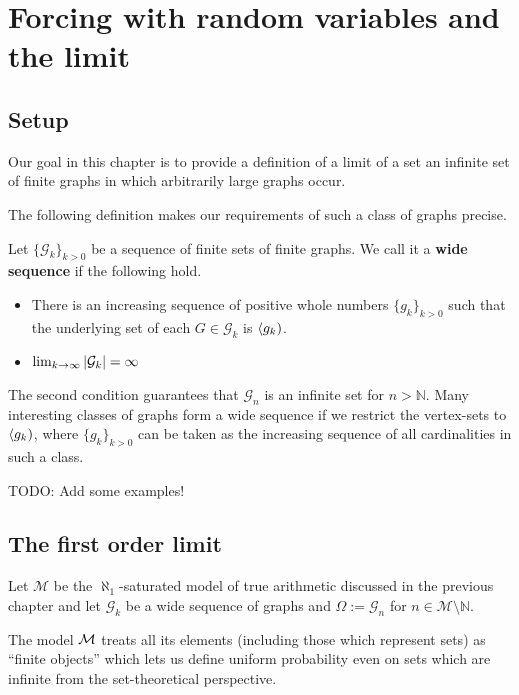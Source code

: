 \chapter{Forcing with random variables and the limit}
\section{Setup}

Our goal in this chapter is to provide a definition of a limit of a set an infinite set of finite graphs in which arbitrarily large graphs occur.

The following definition makes our requirements of such a class of graphs precise.

\begin{defi}
Let $\{\mathcal{G}_k\}_{k>0}$ be a sequence of finite sets of finite graphs. We call it a \textbf{wide sequence} if the following hold.

\begin{itemize}
\item There is an increasing sequence of positive whole numbers $\{g_k\}_{k>0}$ such that the underlying set of each $G\in\mathcal{G}_k$ is $\langle g_k)$.
\item $\lim_{k\to\infty} \left|{\mathcal{G}_k}\right|=\infty$
\end{itemize}
\end{defi}

The second condition guarantees that $\mathcal{G}_n$ is an infinite set for $n>\mathbb{N}$. Many interesting classes of graphs form a wide sequence if we restrict the vertex-sets to $\langle g_k)$, where $\{g_k\}_{k>0}$ can be taken as the increasing sequence of all cardinalities in such a class.

\begin{exam}
TODO: Add some examples!
\end{exam}

\section{The first order limit}

Let $\mathcal{M}$ be the $\aleph_1$-saturated model of true arithmetic discussed in the previous chapter and let $\mathcal{G}_k$ be a wide sequence of graphs and $\Omega:=\mathcal{G}_n$ for $n\in\mathcal{M}\setminus \mathbb{N}$.

The model $\mathcal{M}$ treats all its elements (including those which represent sets) as ``finite objects'' which lets us define uniform probability even on sets which are infinite from the set-theoretical perspective.


